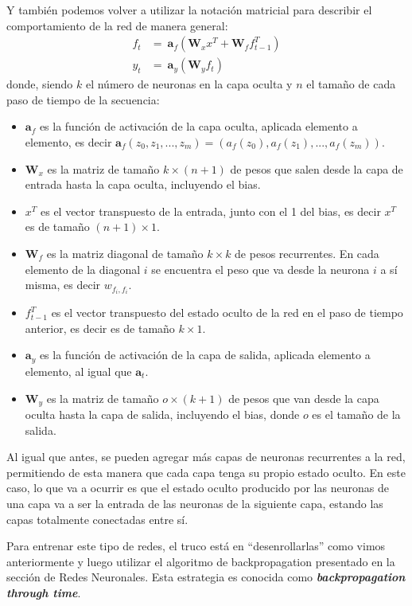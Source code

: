 \documentclass[../../main.tex]{subfiles}
\begin{document}
Y también podemos volver a utilizar la notación matricial para describir el comportamiento
de la red de manera general:
\begin{align*}
    f_t &=\ \bm{a}_f \left( \mathbf{W}_x x^T + \mathbf{W}_f f_{t-1}^T \right) \\
    y_t &=\ \bm{a}_y \left( \mathbf{W}_y f_t \right)
\end{align*}
donde, siendo \(k\) el número de neuronas en la capa oculta y \(n\) el tamaño de cada
paso de tiempo de la secuencia:
\begin{itemize}[itemsep=0.05cm]
    \item \(\bm{a}_f\) es la función de activación de la capa oculta, aplicada elemento a
    elemento, es decir \(\bm{a}_f(z_0, z_1, ..., z_m) = (a_f(z_0), a_f(z_1), ...,
    a_f(z_m))\).
    \item \(\mathbf{W}_x\) es la matriz de tamaño \(k \times (n+1)\) de pesos que salen
    desde la capa de entrada hasta la capa oculta, incluyendo el bias.
    \item \(x^T\) es el vector transpuesto de la entrada, junto con el 1 del bias,
    es decir \(x^T\) es de tamaño \((n+1) \times 1\).
    \item \(\mathbf{W}_f\) es la matriz diagonal de tamaño \(k \times k\) de pesos
    recurrentes. En cada elemento de la diagonal \(i\) se encuentra el peso que va desde
    la neurona \(i\) a sí misma, es decir \(w_{f_i, f_i}\).
    \item \(f_{t-1}^T\) es el vector transpuesto del estado oculto de la red en el paso de
    tiempo anterior, es decir es de tamaño \(k \times 1\).
    \item \(\bm{a}_y\) es la función de activación de la capa de salida, aplicada elemento a
    elemento, al igual que \(\bm{a}_t\).
    \item \(\mathbf{W}_y\) es la matriz de tamaño \(o \times (k+1)\) de pesos que van
    desde la capa oculta hasta la capa de salida, incluyendo el bias, donde \(o\) es el
    tamaño de la salida.
\end{itemize}

Al igual que antes, se pueden agregar más capas de neuronas recurrentes a la red,
permitiendo de esta manera que cada capa tenga su propio estado oculto. En este caso, lo
que va a ocurrir es que el estado oculto producido por las neuronas de una capa va a ser
la entrada de las neuronas de la siguiente capa, estando las capas totalmente conectadas
entre sí.

Para entrenar este tipo de redes, el truco está en ``desenrollarlas'' como vimos
anteriormente y luego utilizar el algoritmo de backpropagation presentado en la sección de
Redes Neuronales. Esta estrategia es conocida como \textbf{\textit{backpropagation through
time}}.
\end{document}
